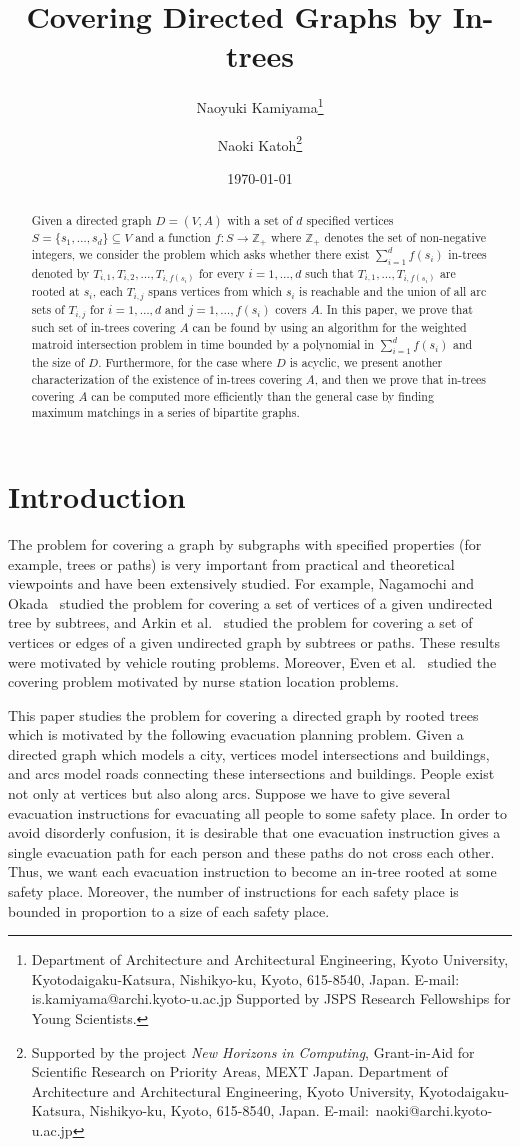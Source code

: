 \documentclass[11pt]{article}
\title{Covering Directed Graphs by In-trees}
\author{Naoyuki {\sc Kamiyama}\thanks{
Department of Architecture and Architectural Engineering,
Kyoto University, 
Kyotodaigaku-Katsura, Nishikyo-ku,
Kyoto, 615-8540, Japan.
E-mail$\colon$ {\ttfamily is.kamiyama@archi.kyoto-u.ac.jp} 
Supported by JSPS Research Fellowships for Young Scientists.}
\and 
Naoki {\sc Katoh}\thanks{Supported by the project {\it New Horizons in
Computing}, Grant-in-Aid for Scientific Research 
on Priority Areas, MEXT Japan.
Department of Architecture and Architectural Engineering,
Kyoto University, 
Kyotodaigaku-Katsura, Nishikyo-ku,
Kyoto, 615-8540, Japan.
E-mail$\colon$ {\ttfamily naoki@archi.kyoto-u.ac.jp} 
}
}
\date{\today}
\newcounter{ni}
\theoremstyle{plain}
\begin{document}
\maketitle

\begin{abstract}
\noindent
Given a directed graph $D=(V,A)$ with a set of $d$ specified vertices
$S=\{s_1,\ldots,s_d\}\subseteq V$ and a function $f\colon
S \to \mathbb{Z}_+$ where $\mathbb{Z}_+$ denotes the set of non-negative integers, 
we consider the problem which asks whether there exist $\sum_{i=1}^d f(s_i)$ in-trees denoted by 
$T_{i,1},T_{i,2},\ldots, T_{i,f(s_i)}$ for every $i=1,\ldots,d$ such that
$T_{i,1},\ldots,T_{i,f(s_i)}$ are rooted at $s_i$, each $T_{i,j}$
spans vertices from which $s_i$ is reachable and the union of all arc sets of
$T_{i,j}$ for $i=1,\ldots,d$ and $j=1,\ldots,f(s_i)$ covers $A$. In this paper, we prove that such set of 
in-trees covering $A$ can be found by using an algorithm for the weighted matroid intersection problem
in time bounded by a polynomial in $\sum_{i=1}^df(s_i)$ and the size of $D$. 
Furthermore, for the case where $D$ is acyclic, 
we present another characterization of the existence of in-trees covering $A$,  
and then we prove that in-trees covering $A$ can be 
computed more efficiently than the general case by finding maximum matchings in a series of bipartite graphs.
\end{abstract}

\section{Introduction}


The problem for covering a graph by subgraphs with specified properties (for example, trees or paths) is
very important from practical and theoretical viewpoints and have
been extensively studied. For example, Nagamochi and Okada~\cite{NO07}
studied the problem for covering a set of vertices of a given undirected
tree by subtrees, and Arkin et al.~\cite{AHL06} studied the problem  
for covering a set of vertices or edges of a given undirected graph by
subtrees or paths. These results were motivated by vehicle routing problems. 
Moreover, Even et al.~\cite{EGKRS04} studied the covering problem
motivated by nurse station location problems. 

This paper studies the problem for covering a directed graph by rooted trees which is 
motivated by the following evacuation planning problem. 
Given a directed graph which models a city, 
vertices model intersections and buildings,
and arcs model roads connecting these intersections and buildings.
People exist not only at vertices but also along arcs. 
Suppose we have to give several evacuation instructions for
evacuating all people to some safety place. In order to avoid disorderly
confusion, it is desirable that one evacuation instruction gives a single evacuation path
for each person and these paths do not cross each other. 
Thus, we want each evacuation instruction to become an
in-tree rooted at some safety place. Moreover, the number of instructions
for each safety place is bounded in proportion to a size of each safety place. 
\end{document}
